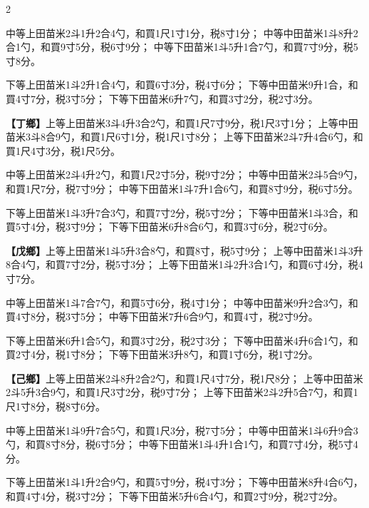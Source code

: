 \documentclass[11pt,a4paper]{article}
\begin{document}
\begin{paracol}{2}
{中等上田苗米2斗1升2合4勺，和買1尺1寸1分，税8寸1分；
中等中田苗米1斗8升2合1勺，和買9寸5分，税6寸9分；
中等下田苗米1斗5升1合7勺，和買7寸9分，税5寸8分。

下等上田苗米1斗2升1合4勺，和買6寸3分，税4寸6分；
下等中田苗米9升1合，和買4寸7分，税3寸5分；
下等下田苗米6升7勺，和買3寸2分，税2寸3分。

\textbf{【丁鄉】}上等上田苗米3斗4升3合2勺，和買1尺7寸9分，税1尺3寸1分；
上等中田苗米3斗8合9勺，和買1尺6寸1分，税1尺1寸8分；
上等下田苗米2斗7升4合6勺，和買1尺4寸3分，税1尺5分。

中等上田苗米2斗4升2勺，和買1尺2寸5分，税9寸2分；
中等中田苗米2斗5合9勺，和買1尺7分，税7寸9分；
中等下田苗米1斗7升1合6勺，和買8寸9分，税6寸5分。

下等上田苗米1斗3升7合3勺，和買7寸2分，税5寸2分；
下等中田苗米1斗3合，和買5寸4分，税3寸9分；
下等下田苗米6升8合6勺，和買3寸6分，税2寸6分。

\textbf{【戊鄉】}上等上田苗米1斗5升3合8勺，和買8寸，税5寸9分；
上等中田苗米1斗3升8合4勺，和買7寸2分，税5寸3分；
上等下田苗米1斗2升3合1勺，和買6寸4分，税4寸7分。

中等上田苗米1斗7合7勺，和買5寸6分，税4寸1分；
中等中田苗米9升2合3勺，和買4寸8分，税3寸5分；
中等下田苗米7升6合9勺，和買4寸，税2寸9分。

下等上田苗米6升1合5勺，和買3寸2分，税2寸3分；
下等中田苗米4升6合1勺，和買2寸4分，税1寸8分；
下等下田苗米3升8勺，和買1寸6分，税1寸2分。

\textbf{【己鄉】}上等上田苗米2斗8升2合2勺，和買1尺4寸7分，税1尺8分；
上等中田苗米2斗5升3合9勺，和買1尺3寸2分，税9寸7分；
上等下田苗米2斗2升5合7勺，和買1尺1寸8分，税8寸6分。

中等上田苗米1斗9升7合5勺，和買1尺3分，税7寸5分；
中等中田苗米1斗6升9合3勺，和買8寸8分，税6寸5分；
中等下田苗米1斗4升1合1勺，和買7寸4分，税5寸4分。

下等上田苗米1斗1升2合9勺，和買5寸9分，税4寸3分；
下等中田苗米8升4合6勺，和買4寸4分，税3寸2分；
下等下田苗米5升6合4勺，和買2寸9分，税2寸2分。
}

\end{paracol}
\end{document}
